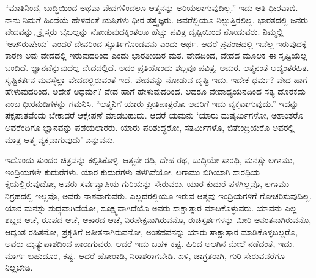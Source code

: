 “ಮಾತಿನಿಂದ, ಬುದ್ಧಿಯಿಂದ ಅಥವಾ ವೇದಗಳಿಂದಲೂ ಆತ್ಮನನ್ನು ಅರಿಯಲಾಗುವು\break ದಿಲ್ಲ.” ಇದು ಅತಿ ಧೀರವಾಣಿ. ನಾನು ನಿಮಗೆ ಹಿಂದೆಯೆ ಹೇಳಿದಂತೆ ಋಷಿಗಳು ಧೀರ ತತ್ತ್ವಜ್ಞರು. ಅವರೆಲ್ಲಿಯೂ ನಿಲ್ಲುತ್ತಿರಲಿಲ್ಲ. ಭಾರತದಲ್ಲಿ ಜನರು ವೇದವನ್ನು, ಕ್ರೈಸ್ತರು ಬೈಬಲ್ಲನ್ನು ನೋಡುವುದಕ್ಕಿಂತಲೂ ಹೆಚ್ಚು ಪವಿತ್ರ ದೃಷ್ಟಿಯಿಂದ ನೋಡುವರು. ನಿಮ್ಮಲ್ಲಿ ‘ಅಪೌರುಷೇಯ’ ಎಂದರೆ ದೇವರಿಂದ ಸ್ಫೂರ್ತಿಗೊಂಡವನು ಎಂದು ಅರ್ಥ. ಆದರೆ ಪ್ರಪಂಚದಲ್ಲಿ ಇವೆಲ್ಲ ಇರುವುದಕ್ಕೆ ಕಾರಣ ಅವು ವೇದದಲ್ಲಿ ಇರುವುದರಿಂದ ಎಂದು ಭಾರತೀಯರ ಮತ. ವೇದದಿಂದ, ವೇದದ ಮೂಲಕ ಈ ಸೃಷ್ಟಿಯೆಲ್ಲ ಬಂದಿದೆ. ಜ್ಞಾನವೆನ್ನುವುದೆಲ್ಲ ವೇದದಲ್ಲಿದೆ. ಅದರ ಪ್ರತಿಯೊಂದು ಶಬ್ದವೂ ಪವಿತ್ರ, ಅಮರ. ಆತ್ಮನಂತೆ ಆದ್ಯಂತರಹಿತ. ಸೃಷ್ಟಿಕರ್ತನ ಮನಸ್ಸೆಲ್ಲಾ ವೇದದಲ್ಲಿರುವಂತೆ ಇದೆ. ವೇದವನ್ನು ನೋಡುವ ದೃಷ್ಟಿ ಇದು. ಇದೇಕೆ ಧರ್ಮ? ವೇದ ಹಾಗೆ ಹೇಳುವುದರಿಂದ. ಅದೇಕೆ ಅಧರ್ಮ? ವೇದ ಹಾಗೆ ಹೇಳುವುದರಿಂದ. ಆದರೂ ವೇದಾಧ್ಯಯನದಿಂದ ಸತ್ಯ ದೊರಕದು ಎಂಬ ಧೀರನುಡಿಗಳನ್ನು ಗಮನಿಸಿ. “ಆತ್ಮನಿಗೆ ಯಾರು ಪ್ರೀತಿಪಾತ್ರರೋ ಅವರಿಗೆ ಇದು ವ್ಯಕ್ತವಾಗುವುದು.” ಇದನ್ನು ಪಕ್ಷಪಾತವೆಂದು ಬೇಕಾದರೆ ಆಕ್ಷೇಪಣೆ ಮಾಡಬಹುದು. ಆದರೆ ಯಮನು ‘ಯಾರು ದುಷ್ಕರ್ಮಿಗಳೋ, ಅಶಾಂತರೊ ಅವರೆಂದಿಗೂ ಜ್ಞಾನವನ್ನು ಪಡೆಯಲಾರರು. ಯಾರು ಪರಿಶುದ್ಧರೋ, ಸತ್ಕರ್ಮಿಗಳೊ, ಜಿತೇಂದ್ರಿಯರೊ ಅವರಲ್ಲಿ ಮಾತ್ರ ಆತ್ಮ ವ್ಯಕ್ತವಾಗುವುದು’ ಎನ್ನುವನು.

\vskip 0.2cm 

ಇದೊಂದು ಸುಂದರ ಚಿತ್ರವನ್ನು ಕಲ್ಪಿಸಿಕೊಳ್ಳಿ. ಆತ್ಮನೇ ರಥಿ, ದೇಹ ರಥ, ಬುದ್ಧಿಯೇ ಸಾರಥಿ, ಮನಸ್ಸೇ ಲಗಾಮು, ಇಂದ್ರಿಯಗಳೇ ಕುದುರೆಗಳು. ಯಾರ ಕುದುರೆಗಳು ಪಳಗಿವೆಯೋ, ಲಗಾಮು ಬಿಗಿಯಾಗಿ ಸಾರಥಿಯ ಕೈಯಲ್ಲಿರುವುದೋ, ಅವರು ಸರ್ವವ್ಯಾಪಿಯ ಗುರಿಯನ್ನು ಸೇರುವರು. ಯಾರ ಕುದುರೆ ಪಳಗಿಲ್ಲವೊ, ಲಗಾಮು ನಿಗ್ರಹದಲ್ಲಿ ಇಲ್ಲವೊ, ಅವರು ನಾಶವಾಗುವರು. ಎಲ್ಲದರಲ್ಲಿಯೂ ಇರುವ ಆತ್ಮವು ಇಂದ್ರಿಯಗಳಿಗೆ ಗೋಚರಿಸುವುದಿಲ್ಲ. ಯಾರ ಮನಸ್ಸು ಶುದ್ಧವಾಗಿದೆಯೋ, ಸೂಕ್ಷ್ಮವಾಗಿದೆಯೊ ಅವರು ಸಾಕ್ಷಾತ್ಕಾರ ಮಾಡಿಕೊಳ್ಳುವರು. ಯಾವನು ಎಲ್ಲ ಶಬ್ದದ ಆಚೆ, ರೂಪದ ಆಚೆ, ಆಕಾರದ ಆಚೆ, ನಿರಪೇಕ್ಷನಾಗಿರುವನೊ, ರುಚಿಸ್ಪರ್ಶಗಳನ್ನು ಮೀರಿ ಅನಂತನಾಗಿರುವನೊ, ಆದ್ಯಂತ ರಹಿತನೋ, ಪ್ರಕೃತಿಗೆ ಅತೀತನಾಗಿರುವನೋ, ಅಂತಹವನನ್ನು ಯಾರು ಸಾಕ್ಷಾತ್ಕಾರ ಮಾಡಿಕೊಳ್ಳಬಲ್ಲರೊ, ಅವರು ಮೃತ್ಯುಪಾಶದಿಂದ ಪಾರಾಗುವರು. ಆದರೆ ಇದು ಬಹಳ ಕಷ್ಟ. ಹಿರಿದ ಅಲಗಿನ ಮೇಲೆ ನಡೆದಂತೆ, ಇದು. ಮಾರ್ಗ ಬಹುದೂರ, ಕಷ್ಟ. ಆದರೆ ಹೋರಾಡಿ, ನಿರಾಶರಾಗಬೇಡಿ. ಏಳಿ, ಜಾಗ್ರತರಾಗಿ, ಗುರಿ ಸೇರುವವರೆಗೂ ನಿಲ್ಲಬೇಡಿ.

\vskip 0.2cm 

